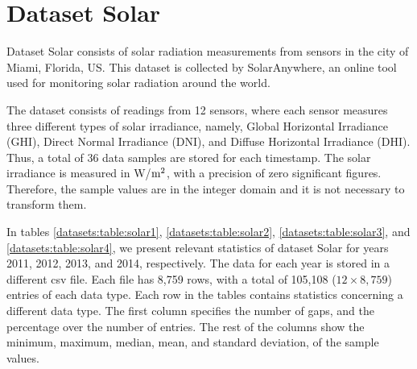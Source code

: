 
\vspace{-25pt}
\section{Dataset Solar}
\label{datasets:solar}

Dataset Solar \cite{dataset:solar} consists of solar radiation measurements from sensors in the city of Miami, Florida, US. This dataset is collected by SolarAnywhere, an online tool used for monitoring solar radiation around the world.


The dataset consists of readings from 12 sensors, where each sensor measures three different types of solar irradiance, namely, Global Horizontal Irradiance (GHI), Direct Normal Irradiance (DNI), and Diffuse Horizontal Irradiance (DHI). Thus, a total of 36 data samples are stored for each timestamp. The solar irradiance is measured in W/$\textnormal{m}^2$, with a precision of zero significant figures. Therefore, the sample values are in the integer domain and it is not necessary to transform them.


In tables \ref{datasets:table:solar1}, \ref{datasets:table:solar2}, \ref{datasets:table:solar3}, and \ref{datasets:table:solar4}, we present relevant statistics of dataset Solar for years 2011, 2012, 2013, and 2014, respectively. The data for each year is stored in a different csv file. Each file has 8,759 rows, with a total of 105,108 ($12\times8,759$) entries of each data type. Each row in the tables contains statistics concerning a different data type. The first column specifies the number of gaps, and the percentage over the number of entries. The rest of the columns show the minimum, maximum, median, mean, and standard deviation, of the sample values.




